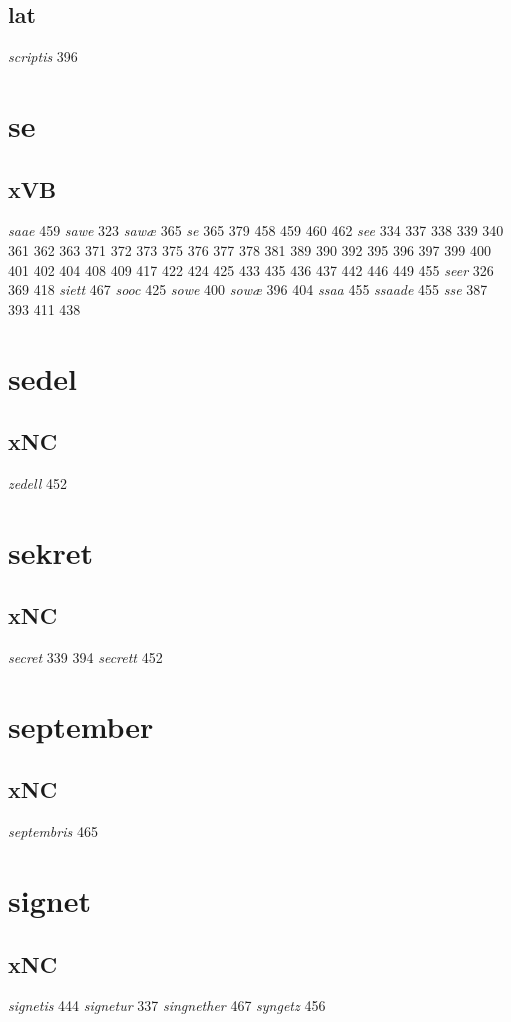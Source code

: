 \documentclass[a4paper,twocolumn]{article}
\begin{document}
\subsection{lat}
\label{sec:org083acab}
\emph{scriptis} 396 
\section{se}
\label{sec:org76a7984}
\subsection{xVB}
\label{sec:org4b5ac0c}
\emph{saae} 459 \emph{sawe} 323 \emph{sawæ} 365 \emph{se} 365 379 458 459 460 462 \emph{see} 334 337 338 339 340 361 362 363 371 372 373 375 376 377 378 381 389 390 392 395 396 397 399 400 401 402 404 408 409 417 422 424 425 433 435 436 437 442 446 449 455 \emph{seer} 326 369 418 \emph{siett} 467 \emph{sooc} 425 \emph{sowe} 400 \emph{sowæ} 396 404 \emph{ssaa} 455 \emph{ssaade} 455 \emph{sse} 387 393 411 438 
\section{sedel}
\label{sec:org44f997d}
\subsection{xNC}
\label{sec:org482a00e}
\emph{zedell} 452 
\section{sekret}
\label{sec:orgb5029c9}
\subsection{xNC}
\label{sec:org17aa045}
\emph{secret} 339 394 \emph{secrett} 452 
\section{september}
\label{sec:org90d309f}
\subsection{xNC}
\label{sec:orgee3bd77}
\emph{septembris} 465 
\section{signet}
\label{sec:org1db613b}
\subsection{xNC}
\label{sec:org49b121c}
\emph{signetis} 444 \emph{signetur} 337 \emph{singnether} 467 \emph{syngetz} 456 
\end{document}
